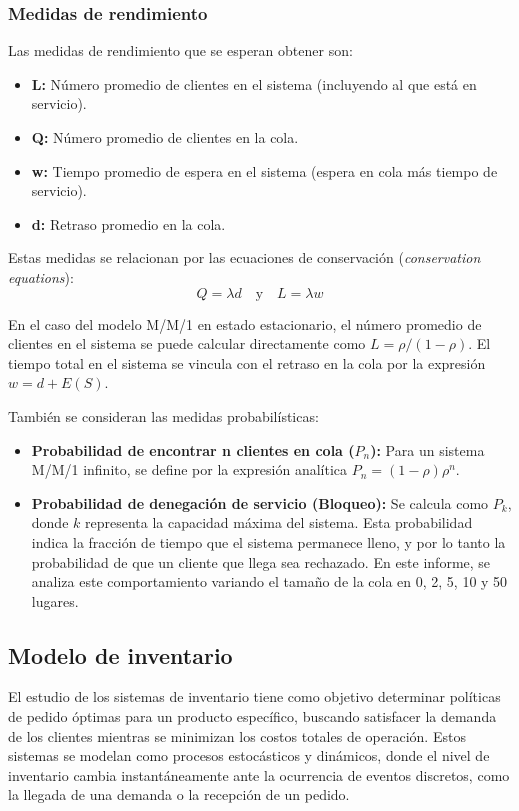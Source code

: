 \documentclass{article}
\begin{document}
\subsubsection{Medidas de rendimiento}
Las medidas de rendimiento que se esperan obtener son:
\begin{itemize}
    \item \textbf{L:} Número promedio de clientes en el sistema (incluyendo al que está en servicio).
    \item \textbf{Q:} Número promedio de clientes en la cola.
    \item \textbf{w:} Tiempo promedio de espera en el sistema (espera en cola más tiempo de servicio).
    \item \textbf{d:} Retraso promedio en la cola.
\end{itemize}

Estas medidas se relacionan por las ecuaciones de conservación (\textit{conservation equations}):
\begin{equation}
Q = \lambda d \quad \text{y} \quad L = \lambda w
\end{equation}

En el caso del modelo M/M/1 en estado estacionario, el número promedio de clientes en el sistema se puede calcular directamente como $L = \rho / (1 - \rho)$. El tiempo total en el sistema se vincula con el retraso en la cola por la expresión $w = d + E(S)$.

También se consideran las medidas probabilísticas:
\begin{itemize}
    \item \textbf{Probabilidad de encontrar n clientes en cola ($P_n$):} Para un sistema M/M/1 infinito, se define por la expresión analítica $P_n = (1 - \rho)\rho^n$.
    \item \textbf{Probabilidad de denegación de servicio (Bloqueo):} Se calcula como $P_k$, donde $k$ representa la capacidad máxima del sistema. Esta probabilidad indica la fracción de tiempo que el sistema permanece lleno, y por lo tanto la probabilidad de que un cliente que llega sea rechazado. En este informe, se analiza este comportamiento variando el tamaño de la cola en 0, 2, 5, 10 y 50 lugares.
\end{itemize}

\subsection{Modelo de inventario}
El estudio de los sistemas de inventario tiene como objetivo determinar políticas de pedido óptimas para un producto específico, buscando satisfacer la demanda de los clientes mientras se minimizan los costos totales de operación. Estos sistemas se modelan como procesos estocásticos y dinámicos, donde el nivel de inventario cambia instantáneamente ante la ocurrencia de eventos discretos, como la llegada de una demanda o la recepción de un pedido.
\end{document}

